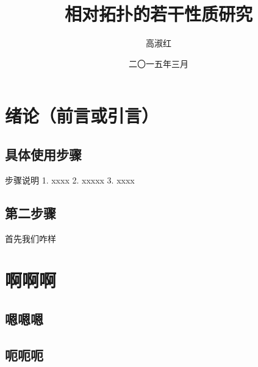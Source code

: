 \documentclass[forlib]{HNUthesis}   %
\begin{document}

\title{相对拓扑的若干性质研究}               %
\author{高淑红}                             %
\date{二〇一五年三月}                       %

\maketitle


\tableofcontents
\thispagestyle{empty}

\frontmatter  %

\mainmatter   %

\baselineskip=21pt  %

\chapter{绪论（前言或引言）}

\section{具体使用步骤}

步骤说明
1. xxxx
2. xxxxx
3. xxxx

\section{第二步骤}

首先我们咋样

\chapter{啊啊啊}

\section{嗯嗯嗯}

\section{呃呃呃}
\end{document}
